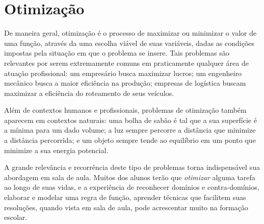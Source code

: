 \chapter{Otimização}
\label{cap:otimizacao}




    
De maneira geral, otimização é o processo de maximizar ou minimizar o valor de uma função, através da uma escolha viável de suas variáveis, dadas as condições impostas pela situação em que o problema se insere. Tais problemas são relevantes por serem extremamente comuns em praticamente qualquer área de atuação profissional: um empresário busca maximizar lucros; um engenheiro mecânico busca a maior eficiência na produção; empresas de logística buscam maximizar a eficiência do roteamento de seus veículos.

Além de contextos humanos e profissionais, problemas de otimização também aparecem em contextos naturais: uma bolha de sabão é tal que a sua superfície é a mínima para um dado volume; a luz sempre percorre a distância que minimize a distância percorrida; e um objeto sempre tende ao equilíbrio em um ponto que minimize a sua energia potencial.

A grande relevância e recorrência deste tipo de problemas torna indispensável sua abordagem em sala de aula. Muitos dos alunos terão que \textit{otimizar} alguma tarefa ao longo de suas vidas, e a experiência de reconhecer domínios e contra-domínios, elaborar e modelar uma regra de função, aprender técnicas que facilitem suas resoluções, quando vista em sala de aula, pode acrescentar muito na formação escolar.

